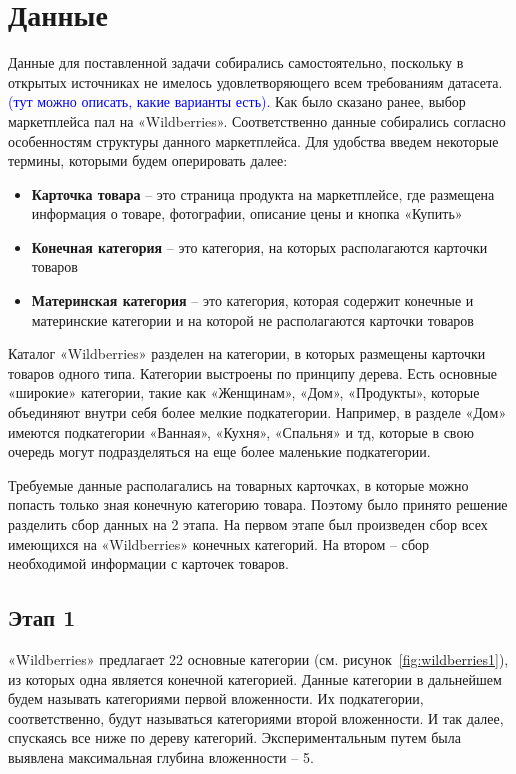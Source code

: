 \documentclass[a4paper,12pt]{extarticle}
\begin{document}
\newpage
\section{Данные} 

Данные для поставленной задачи собирались самостоятельно, поскольку в открытых источниках не имелось удовлетворяющего всем требованиям датасета. \textcolor{blue}{(тут можно описать, какие варианты есть).} Как было сказано ранее, выбор маркетплейса пал на «Wildberries». Соответственно данные собирались согласно особенностям структуры данного маркетплейса. Для удобства введем некоторые термины, которыми будем оперировать далее:
\begin{itemize}
	\item \textbf{Карточка товара} – это страница продукта на маркетплейсе, где размещена информация о товаре, фотографии, описание цены и кнопка «Купить»
	\item \textbf{Конечная категория} – это категория, на которых располагаются карточки товаров
	\item \textbf{Материнская категория} – это категория, которая содержит конечные и материнские категории и на которой не располагаются карточки товаров
\end{itemize}

Каталог «Wildberries» разделен на категории, в которых размещены карточки товаров одного типа. Категории выстроены по принципу дерева. Есть основные «широкие» категории, такие как «Женщинам», «Дом», «Продукты», которые объединяют внутри себя более мелкие подкатегории. Например, в разделе «Дом» имеются подкатегории «Ванная», «Кухня», «Спальня» и тд, которые в свою очередь могут подразделяться на еще более маленькие подкатегории. 

Требуемые данные располагались на товарных карточках, в которые можно попасть только зная конечную категорию товара. Поэтому было принято решение разделить сбор данных на 2 этапа. На первом этапе был произведен сбор всех имеющихся на «Wildberries» конечных категорий. На втором – сбор необходимой информации с карточек товаров.

\subsection{Этап 1}

«Wildberries» предлагает 22 основные категории (см. рисунок~\ref{fig:wildberries1}), из которых одна является конечной категорией. Данные категории в дальнейшем будем называть категориями первой вложенности. Их подкатегории, соответственно, будут называться категориями второй вложенности. И так далее, спускаясь все ниже по дереву категорий. Экспериментальным путем была выявлена максимальная глубина вложенности – 5.
\end{document}
